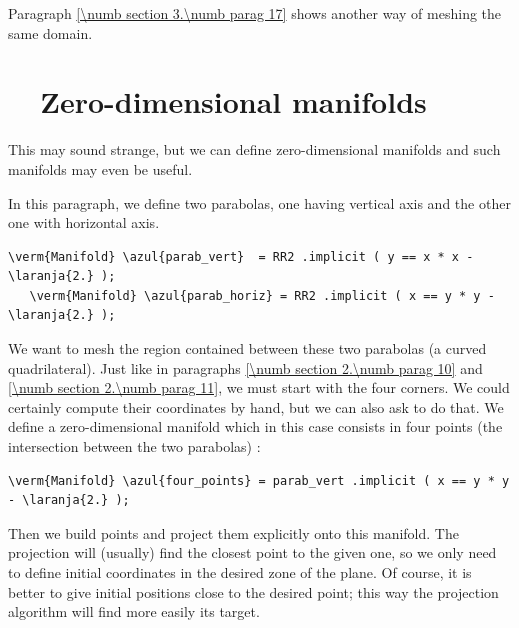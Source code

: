 Paragraph \ref{\numb section 3.\numb parag 17} shows another way of meshing the same domain.


\section{~~Zero-dimensional manifolds}\label{\numb section 2.\numb parag 12}

This may sound strange, but we can define zero-dimensional manifolds and
such manifolds may even be useful.

In this paragraph, we define two parabolas, one having vertical axis and the other one with
horizontal axis.

\begin{Verbatim}[commandchars=\\\{\},formatcom=\small\tt,frame=single,
   label=parag-\ref{\numb section 2.\numb parag 12}.cpp,rulecolor=\color{moldura},
   baselinestretch=0.94,framesep=2mm]
   \verm{Manifold} \azul{parab_vert}  = RR2 .implicit ( y == x * x - \laranja{2.} );
   \verm{Manifold} \azul{parab_horiz} = RR2 .implicit ( x == y * y - \laranja{2.} );
\end{Verbatim}

We want to mesh the region contained between these two parabolas (a curved quadrilateral).
Just like in paragraphs \ref{\numb section 2.\numb parag 10} and \ref{\numb section 2.\numb parag 11},
we must start with the four corners.
We could certainly compute their coordinates by hand, but we can also ask {\maniFEM} to do that.
We define a zero-dimensional manifold which in this case consists in four points
(the intersection between the two parabolas) :

\begin{Verbatim}[commandchars=\\\{\},formatcom=\small\tt,frame=single,
   label=parag-\ref{\numb section 2.\numb parag 12}.cpp,rulecolor=\color{moldura},
   baselinestretch=0.94,framesep=2mm]
   \verm{Manifold} \azul{four_points} = parab_vert .implicit ( x == y * y - \laranja{2.} );
\end{Verbatim}

Then we build points and project them explicitly onto this manifold.
The projection will (usually) find the closest point to the given one, so we only need to define
initial coordinates in the desired zone of the plane.
Of course, it is better to give initial positions close to the desired point;
this way the projection algorithm will find more easily its target.

